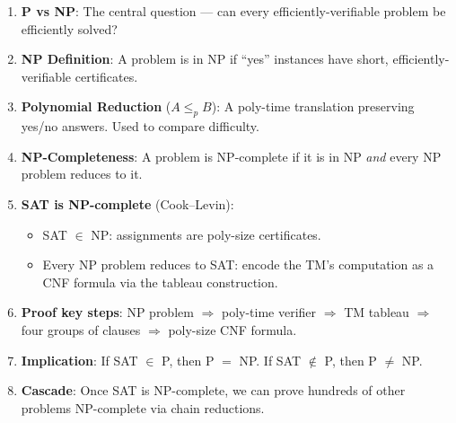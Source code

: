 \documentclass[12pt,a4paper]{article}
\newcommand{\leqp}{\leq_p}
\begin{document}
\begin{tcolorbox}[
  enhanced, breakable,
  colback=lightblue, colframe=darkblue, fonttitle=\bfseries\large,
  title={The Cook--Levin Theorem: Complete Summary},
  attach boxed title to top left={yshift=-3mm,xshift=4mm},
  boxed title style={colback=darkblue}
]
\begin{enumerate}[leftmargin=1.5em, itemsep=0.8em]
  \item \textbf{P vs NP}: The central question --- can every efficiently-verifiable problem 
    be efficiently solved?

  \item \textbf{NP Definition}: A problem is in NP if ``yes'' instances have short, 
    efficiently-verifiable certificates.

  \item \textbf{Polynomial Reduction} ($A \leqp B$): A poly-time translation preserving 
    yes/no answers. Used to compare difficulty.

  \item \textbf{NP-Completeness}: A problem is NP-complete if it is in NP \emph{and} 
    every NP problem reduces to it.

  \item \textbf{SAT is NP-complete} (Cook--Levin):
    \begin{itemize}
      \item[$\bullet$] SAT $\in$ NP: assignments are poly-size certificates.
      \item[$\bullet$] Every NP problem reduces to SAT: encode the TM's computation 
        as a CNF formula via the tableau construction.
    \end{itemize}

  \item \textbf{Proof key steps}: 
    NP problem $\Rightarrow$ poly-time verifier $\Rightarrow$ TM tableau 
    $\Rightarrow$ four groups of clauses $\Rightarrow$ poly-size CNF formula.

  \item \textbf{Implication}: If SAT $\in$ P, then P $=$ NP.
    If SAT $\notin$ P, then P $\neq$ NP.

  \item \textbf{Cascade}: Once SAT is NP-complete, we can prove hundreds of 
    other problems NP-complete via chain reductions.
\end{enumerate}
\end{tcolorbox}

\bigskip
\end{document}
